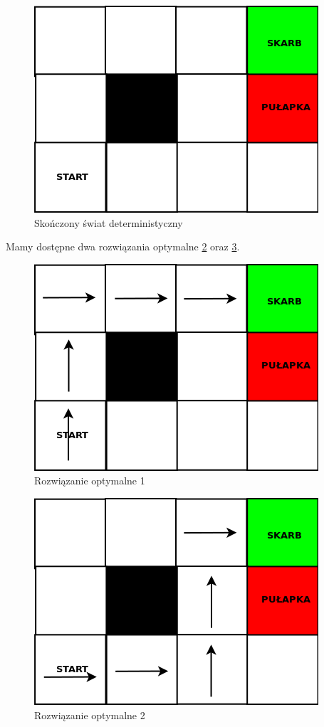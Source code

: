 \documentclass[10pt,a4paper]{book}
\begin{document}
\begin{figure}
\centering
\includegraphics[scale=0.3]{grids/deterministyczny.png}
\caption{Skończony świat deterministyczny} \label{fig-grid-deterministic}
\end{figure}

Mamy dostępne dwa rozwiązania optymalne \ref{fig-grid-deterministic-1sol} oraz \ref{fig-grid-deterministic-2sol}.

\begin{figure}
\centering
\includegraphics[scale=0.3]{grids/det_solution1.png}
\caption{Rozwiązanie optymalne 1} \label{fig-grid-deterministic-1sol}
\end{figure}

\begin{figure}
\centering
\includegraphics[scale=0.3]{grids/det_solution2.png}
\caption{Rozwiązanie optymalne 2} \label{fig-grid-deterministic-2sol}
\end{figure}
\end{document}
